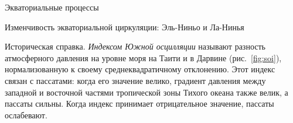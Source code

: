 \begin{chapter}{Экваториальные процессы}
\begin{section}{Изменчивость экваториальной циркуляции: Эль-Ниньо и Ла-Нинья}
\begin{paragraph}{Историческая справка.}
\emph{Индексом Южной осцилляции} 
называют разность атмосферного давления на уровне моря на Таити и в Дарвине
(рис.~\ref{fig:soi}), нормализованную к своему среднеквадратичному отклонению.
Этот индекс связан с пассатами: когда его значение
велико, градиент давления между западной и восточной частями тропической зоны
Тихого океана также велик, а пассаты сильны. Когда индекс принимает 
отрицательное значение, пассаты ослабевают.
%


\end{paragraph}
\end{section}
\end{chapter}
